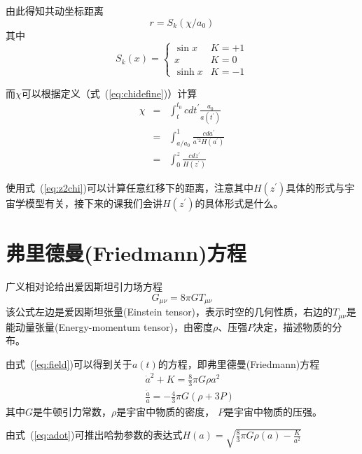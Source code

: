 \documentclass[12pt]{ctexart}
\newcommand{\refeq}[1]{式~(\ref{#1})}
\begin{document}
由此得知共动坐标距离
\begin{equation}
    r = S_k(\chi/a_0)
\end{equation}
其中
\begin{equation}
    S_k(x) = 
    \begin{cases}
        \sin{x} & K=+1 \\ 
        x & K=0 \\ 
        \sinh{x}  & K=-1
    \end{cases}
\end{equation}

而$\chi$可以根据定义（\refeq{eq:chidefine}）计算
\begin{eqnarray}
    \chi &=& \int_t^{t_0} c dt^\prime \frac{a_0}{a(t^\prime)} \\
        &=& \int_{a/a_0}^{1}  \frac{c da^\prime}{a^{\prime 2}H(a^\prime)} \\
        &=& \int_{0}^{z}  \frac{c dz^\prime}{H(z^\prime)} \label{eq:z2chi}
\end{eqnarray}

使用\refeq{eq:z2chi}可以计算任意红移下的距离，注意其中$H(z^\prime)$具体的形式与宇宙学模型有关，接下来的课我们会讲$H(z^\prime)$的具体形式是什么。

\section{弗里德曼(Friedmann)方程}

广义相对论给出爱因斯坦引力场方程
\begin{equation} \label{eq:field}
    G_{\mu \nu} = 8 \pi G T_{\mu \nu}
\end{equation}
该公式左边是爱因斯坦张量(Einstein tensor)，表示时空的几何性质，右边的$T_{\mu\nu}$是能动量张量(Energy-momentum tensor)，由密度$\rho$、压强$P$决定，描述物质的分布。

由\refeq{eq:field}可以得到关于$a(t)$的方程，即弗里德曼(Friedmann)方程
\begin{eqnarray}
    &&\dot{a}^2+K = \frac{8}{3} \pi G \rho a^2 \label{eq:adot} \\
    &&\frac{\ddot{a}}{a} = -\frac{4}{3} \pi G (\rho + 3P)
\end{eqnarray}
其中$G$是牛顿引力常数，$\rho$是宇宙中物质的密度， $P$是宇宙中物质的压强。 

由\refeq{eq:adot}可推出哈勃参数的表达式$H(a)=\sqrt{\frac{8}{3}\pi G \rho(a)-\frac{K}{a^2}}$
\end{document}
